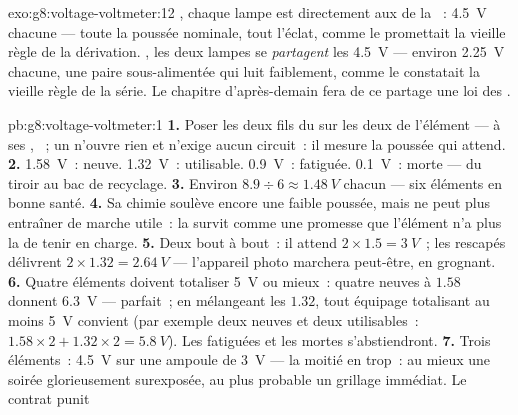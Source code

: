\begin{solution}{exo:g8:voltage-voltmeter:12}
, chaque lampe est directement aux  de la ~:
\qty{4.5}{V} chacune --- toute la poussée nominale, tout l'éclat,
comme le promettait la vieille règle de la dérivation. , les
deux lampes se \emph{partagent} les \qty{4.5}{V} --- environ
\qty{2.25}{V} chacune, une paire sous-alimentée qui luit faiblement,
comme le constatait la vieille règle de la série. Le chapitre
d'après-demain fera de ce partage une loi des .
\end{solution}

\begin{solution}{pb:g8:voltage-voltmeter:1}
\textbf{1.} Poser les deux fils du  sur les deux  de
l'élément --- à ses , ~; un  n'ouvre rien
et n'exige aucun circuit~: il mesure la poussée qui attend.
\textbf{2.} \qty{1.58}{V}~: neuve. \qty{1.32}{V}~: utilisable.
\qty{0.9}{V}~: fatiguée. \qty{0.1}{V}~: morte --- du tiroir au bac de
recyclage.
\textbf{3.} Environ $8.9 \div 6 \approx \qty{1.48}{V}$ chacun ---
six éléments en bonne santé.
\textbf{4.} Sa chimie soulève encore une faible poussée, mais ne peut
plus entraîner de marche utile~: la  survit comme une promesse
que l'élément n'a plus la  de tenir en charge.
\textbf{5.} Deux bout à bout~: il attend $2 \times 1.5 = \qty{3}{V}$~;
les rescapés délivrent $2 \times 1.32 = \qty{2.64}{V}$ --- l'appareil
photo marchera peut-être, en grognant.
\textbf{6.} Quatre éléments doivent totaliser \qty{5}{V} ou mieux~:
quatre neuves à $1.58$ donnent \qty{6.3}{V} --- parfait~; en
mélangeant les $1.32$, tout équipage totalisant au moins \qty{5}{V}
convient (par exemple deux neuves et deux utilisables~:
$1.58 \times 2 + 1.32 \times 2 = \qty{5.8}{V}$). Les fatiguées et les
mortes s'abstiendront.
\textbf{7.} Trois éléments~: \qty{4.5}{V} sur une ampoule de
\qty{3}{V} --- la moitié en trop~: au mieux une soirée glorieusement
surexposée, au plus probable un grillage immédiat. Le contrat punit

\end{solution}
